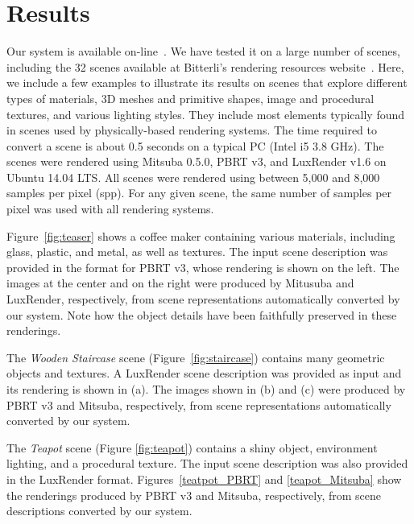 \chapter{Results}
\label{sec:results}


Our system is available on-line~\cite{sceneConverter}.
We have tested it on a large number of scenes, including the 32 scenes available
at Bitterli's rendering resources website~\cite{resources16}. 
Here, we include a few examples to illustrate its results on scenes that explore different 
types of materials, 3D meshes and primitive shapes, image and 
procedural textures, and various lighting styles. They include most elements typically found in scenes used by physically-based rendering systems.  The time required to convert a scene is about 0.5 seconds on a typical PC (Intel i5 3.8 GHz).
% 
%
The scenes were rendered using Mitsuba 0.5.0, PBRT v3, and LuxRender v1.6 on 
Ubuntu 14.04 LTS. All scenes were rendered using between 5,000 and 8,000 samples per pixel (spp). For any given scene,
the same number of samples per pixel was used with all rendering systems. 

Figure~\ref{fig:teaser} shows a coffee maker containing various materials, including glass, plastic, and metal, as well as textures. The input scene description was provided in the format for PBRT v3, whose rendering is shown on the left. The images at the center and on the right were produced by Mitusuba and LuxRender, respectively, from scene representations automatically converted by our system. 
Note how the object details have been faithfully preserved in these renderings.

The \textit{Wooden Staircase} scene (Figure~\ref{fig:staircase}) contains many geometric objects and textures. 
A LuxRender scene description was provided as input and its rendering is shown in (a). The images shown in (b) and (c) were produced 
by PBRT v3 and Mitsuba, respectively, from scene representations automatically converted by our system. 

The \textit{Teapot} scene (Figure \ref{fig:teapot}) contains a shiny object, environment lighting, and a procedural texture. The input scene description was also provided in the LuxRender format. Figures~\ref{teatpot_PBRT} and \ref{teapot_Mitsuba} show the renderings produced by PBRT v3 and Mitsuba, respectively, from scene descriptions converted by our system.

